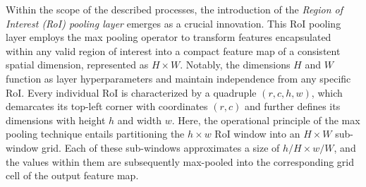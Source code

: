 Within the scope of the described processes, the introduction of the \textit{Region of Interest (RoI) pooling layer} emerges as a crucial innovation. This RoI pooling layer employs the max pooling operator to transform features encapsulated within any valid region of interest into a compact feature map of a consistent spatial dimension, represented as \(H \times W\). Notably, the dimensions \(H\) and \(W\) function as layer hyperparameters and maintain independence from any specific RoI. Every individual RoI is characterized by a quadruple \((r, c, h, w)\), which demarcates its top-left corner with coordinates \((r, c)\) and further defines its dimensions with height \(h\) and width \(w\). Here, the operational principle of the max pooling technique entails partitioning the \(h \times w\) RoI window into an \(H \times W\) sub-window grid. Each of these sub-windows approximates a size of \(h/H \times w/W\), and the values within them are subsequently max-pooled into the corresponding grid cell of the output feature map.\\

